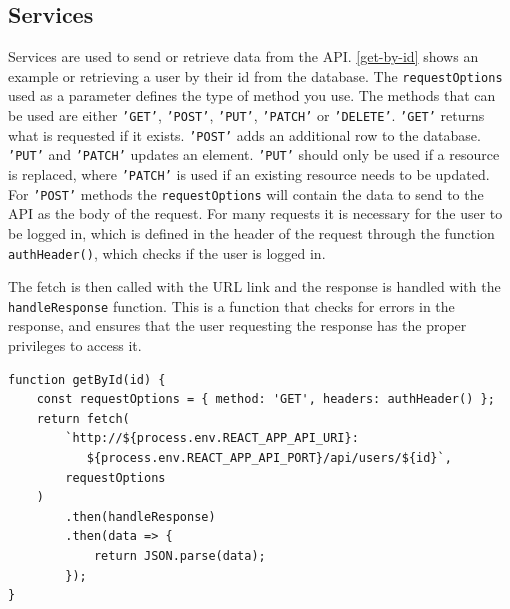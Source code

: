\subsection{Services}
Services are used to send or retrieve data from the API. 
\autoref{get-by-id} shows an example or retrieving a user by their id from the database.
The \texttt{requestOptions} used as a parameter defines the type of method you use.
The methods that can be used are either \texttt{'GET'}, \texttt{'POST'}, \texttt{'PUT'}, \texttt{'PATCH'} or \texttt{'DELETE'}.
\texttt{'GET'} returns what is requested if it exists.
\texttt{'POST'} adds an additional row to the database.
\texttt{'PUT'} and \texttt{'PATCH'} updates an element. 
\texttt{'PUT'} should only be used if a resource is replaced, where \texttt{'PATCH'} is used if an existing resource needs to be updated.
For \texttt{'POST'} methods the \texttt{requestOptions} will contain the data to send to the API as the body of the request.
For many requests it is necessary for the user to be logged in, which is defined in the header of the request through the function \texttt{authHeader()}, which checks if the user is logged in.

The fetch is then called with the URL link and the response is handled with the \texttt{handleResponse} function. 
This is a function that checks for errors in the response, and ensures that the user requesting the response has the proper privileges to access it.

\begin{lstlisting}[caption={Function to get a user by ID.}, captionpos=b, label={get-by-id}]
function getById(id) {
	const requestOptions = { method: 'GET', headers: authHeader() };
	return fetch(
        `http://${process.env.REACT_APP_API_URI}:
           ${process.env.REACT_APP_API_PORT}/api/users/${id}`,
		requestOptions
	)
		.then(handleResponse)
		.then(data => {
			return JSON.parse(data);
		});
}
\end{lstlisting}


